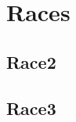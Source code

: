 \clearpage
\section{Races}
\lipsum[1]



\subsection{Race2}
\lipsum[2]
\subsection{Race3}
\lipsum[2]